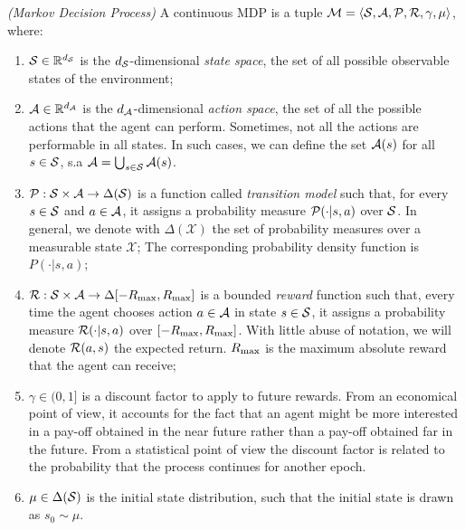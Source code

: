\begin{definition} \emph{(Markov Decision Process)}
A continuous \gls{MDP} \cite{puterman2014markov, sutton2018reinforcement} is a tuple $\mathcal{M} = \langle\mathcal{S},\mathcal{A},\mathcal{P},\mathcal{R},\gamma,\mu\rangle$, where:

\begin{enumerate}
\item $\mathcal{S}\in\mathbb{R}^{d_{\mathcal{S}}}$ is the $d_{\mathcal{S}}$-dimensional \emph{state space}, \ie the set of all possible observable states of the environment;
\item $\mathcal{A}\in\mathbb{R}^{d_{\mathcal{A}}}$ is the $d_{\mathcal{A}}$-dimensional \emph{action space}, \ie the set of all the possible actions that the agent can perform. Sometimes, not all the actions are performable in all states. In such cases, we can define the set $\mathcal{A}(s)$ for all $s \in \mathcal{S}$, s.a  $\mathcal{A} = \bigcup_{s \in \mathcal{S}} \mathcal{A}(s)$.
\item  $\mathcal{P}:\mathcal{S}\times\mathcal{A}\to\Delta(\mathcal{S})$ is a function called \emph{transition model} such that, for every $s\in\mathcal{S}$ and $a\in\mathcal{A}$, it assigns a probability measure $\mathcal{P}(\cdot|s,a)$ over $\mathcal{S}$. In general, we denote with $\Delta(\mathcal{X})$ the set of probability measures over a measurable state $\mathcal{X}$; The corresponding probability density function is $P(\cdot|s,a)$; 
\item $\mathcal{R}:\mathcal{S}\times\mathcal{A}\to\Delta[-R_{\max},R_{\max}]$ is a bounded \emph{reward} function such that, every time the agent chooses action $a\in\mathcal{A}$ in state $s\in\mathcal{S}$, it assigns a probability measure $\mathcal{R}(\cdot|s,a)$ over $[-R_{\max},R_{\max}]$. With little abuse of notation, we will denote $\mathcal{R}(a, s)$ the expected return. $R_{\max}$ is the maximum absolute reward that the agent can receive;
\item $\gamma\in(0,1]$ is a discount factor to apply to future rewards. From an economical point of view, it accounts for the fact that an agent might be more interested in a pay-off obtained in the near future rather than a pay-off obtained far in the future. From a statistical point of view the discount factor is related to the probability that the process continues for another epoch.
\item $\mu\in\Delta(\mathcal{S})$ is the initial state distribution, such that the initial state is drawn as $s_0\sim\mu$.
\end{enumerate}
\end{definition}

